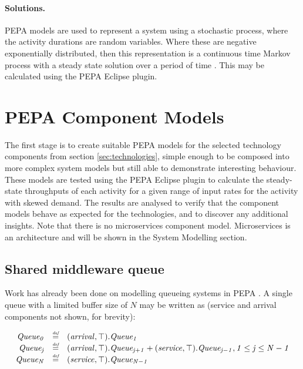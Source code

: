 \documentclass[runningheads]{llncs}
\begin{document}
\paragraph{Solutions.} PEPA models are used to represent a system using a stochastic process, where the activity durations are random variables.  Where these are negative exponentially distributed, then this representation is a continuous time Markov process with a steady state solution over a period of time \cite{RN1051}.  This may be calculated using the PEPA Eclipse plugin.

%
%

\section{PEPA Component Models}\label{sec:pepa-component-models}

The first stage is to create suitable PEPA models for the selected technology components from section \ref{sec:technologies}, simple enough to be composed into more complex system models but still able to demonstrate interesting behaviour.  These models are tested using the PEPA Eclipse plugin \cite{RN1080} to calculate the steady-state throughputs of each activity for a given range of input rates for the activity with skewed demand.  The results are analysed to verify that the component models behave as expected for the technologies, and to discover any additional insights.  Note that there is no microservices component model.  Microservices is an architecture and will be shown in the System Modelling section.

%
%
\FloatBarrier
\subsection{Shared middleware queue}

Work has already been done on modelling queueing systems in PEPA \cite{RN75}.  A single queue with a limited buffer size of $\mathit{N}$ may be written as (service and arrival components not shown, for brevity):

\begin{displaymath}
\centering
\begin{array}{rcl}
\mathit{Queue_0} & \rmdef & (\mathit{arrival},\mathit{\top}).\mathit{Queue_1}\\
\mathit{Queue_j} & \rmdef & (\mathit{arrival},\mathit{\top}).\mathit{Queue_{j+1}} + (\mathit{service},\mathit{\top}).\mathit{Queue_{j-1}}, \mathit{1 \le j \le N-1}\\
\mathit{Queue_N} & \rmdef & (\mathit{service},\mathit{\top}).\mathit{Queue_{N-1}}\\
\end{array}
\end{displaymath}
\end{document}
